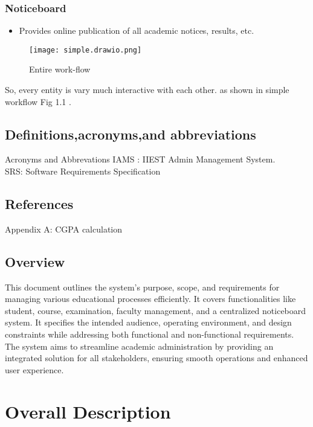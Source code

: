 \documentclass{scrreprt}
\begin{document}
\subsection{Noticeboard}
\begin{itemize}
    \item Provides online publication of all academic notices, results, etc.
\end{itemize}

\begin{figure}
    \centering
    \texttt{[image: simple.drawio.png]}
    \caption{Entire work-flow}
    \label{fig:IICT WEBSITE}
\end{figure}

\newline
So, every entity is vary much interactive with each other. as shown in simple workflow Fig 1.1 .


\section{Definitions,acronyms,and abbreviations}
Acronyms and Abbrevations
IAMS : IIEST Admin Management System.\\
SRS: Software Requirements Specification



\section{References}
Appendix A: CGPA calculation\\


\section{Overview}
This document outlines the system's purpose, scope, and requirements for managing various educational processes efficiently. It covers functionalities like student, course, examination, faculty management, and a centralized noticeboard system. It specifies the intended audience, operating environment, and design constraints while addressing both functional and non-functional requirements. The system aims to streamline academic administration by providing an integrated solution for all stakeholders, ensuring smooth operations and enhanced user experience.



\chapter{Overall Description}
\end{document}
